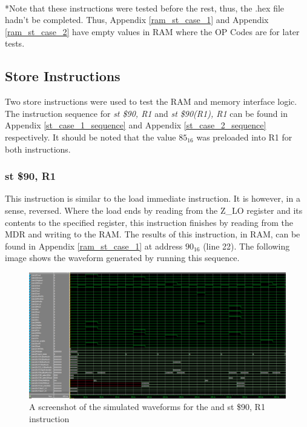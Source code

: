 \documentclass{article}
\begin{document}
    \\
    \small{*Note that these instructions were tested before the rest, thus, the .hex file hadn't be completed. Thus, Appendix \ref{ram_st_case_1} and Appendix \ref{ram_st_case_2} have empty values in RAM where the OP Codes are for later tests.}

    \subsection{Store Instructions}
        Two store instructions were used to test the RAM and memory interface logic. The instruction sequence for \emph{st \$90, R1} and \emph{st \$90(R1), R1} can be found in Appendix \ref{st_case_1_sequence} and Appendix \ref{st_case_2_sequence} respectively. It should be noted that the value $85_{16}$ was preloaded into R1 for both instructions.
        
        \subsubsection{st \$90, R1}
            This instruction is similar to the load immediate instruction. It is however, in a sense, reversed. Where the load ends by reading from the Z\_LO register and its contents to the specified register, this instruction finishes by reading from the MDR and writing to the RAM. The results of this instruction, in RAM, can be found in Appendix \ref{ram_st_case_1} at address $90_{16}$ (line 22). The following image shows the waveform generated by running this sequence. 

            \begin{figure}[h!]
                \begin{center}
                    \includegraphics[width=15cm]{st_case_1_wave.png}
                    \caption{A screenshot of the simulated waveforms for the and st \$90, R1 instruction}
                \end{center}
            \end{figure}
\end{document}

